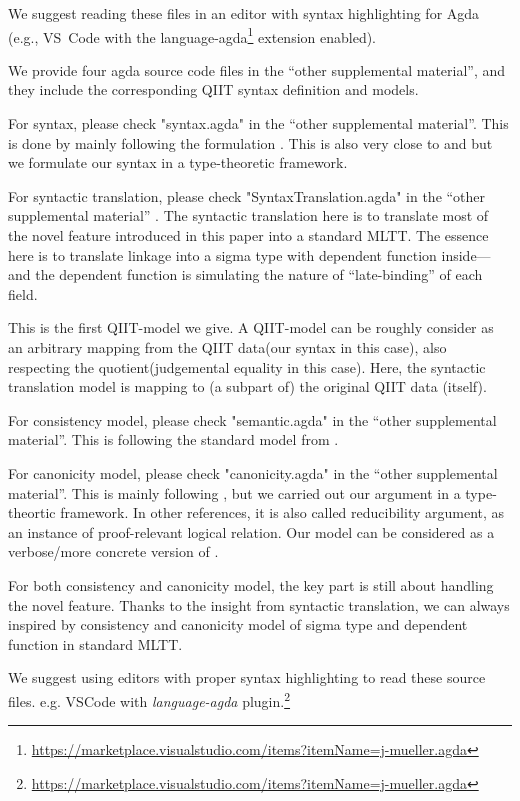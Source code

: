 We suggest reading these files in an editor with syntax highlighting for Agda
(e.g., \mbox{VS~Code} with the \textsf{language-agda}\footnote{\url{https://marketplace.visualstudio.com/items?itemName=j-mueller.agda}}
extension enabled).


\ifShowOldWriting

\bigskip

We provide four agda source code files in the ``other supplemental material'', and they include the corresponding QIIT syntax definition and models. 

For syntax, please check "syntax.agda" in the ``other supplemental material''. This is done by mainly following the formulation \citet{altkap2016}. This is also very close to \citet{coquand2018canonicity} and \citet{sterling2019algebraic} but we formulate our syntax in a type-theoretic framework.

For syntactic translation, please check "SyntaxTranslation.agda" in the ``other supplemental material'' . The syntactic translation here is to translate most of the novel feature introduced in this paper into a standard MLTT. 
The essence here is to translate linkage into a sigma type  with dependent function inside---and the dependent function is simulating the nature of ``late-binding'' of each field.


This is the first QIIT-model we give. A QIIT-model can be roughly consider as an arbitrary mapping from the QIIT data(our syntax in this case), also respecting the quotient(judgemental equality in this case). Here, the syntactic translation model is mapping to (a subpart of) the original QIIT data (itself). 

For consistency model, please check "semantic.agda" in the ``other supplemental material''. This is following the standard model from \citet{altkap2016,kaposi2017type,kaposi2019gluing}.

For canonicity model, please check "canonicity.agda" in the ``other supplemental material''. This is mainly following \citet{coquand2018canonicity,sterling2019algebraic}, but we carried out our argument in a type-theortic framework.  In other references, it is also called reducibility argument, as an instance of proof-relevant logical relation. Our model can be considered as a verbose/more concrete version of \citet{kaposi2019gluing}.

For both consistency and canonicity model, the key part is still about handling the novel feature. Thanks to the insight from syntactic translation, we can always inspired by consistency and canonicity model of sigma type and dependent function in standard MLTT.

We suggest using editors with proper syntax highlighting to read these source files. e.g. VSCode with \textit{language-agda} plugin.\footnote{\url{https://marketplace.visualstudio.com/items?itemName=j-mueller.agda}} 

\fi